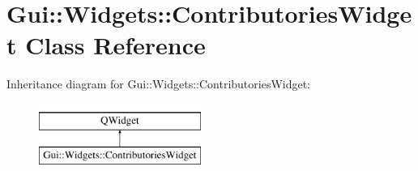 \hypertarget{classGui_1_1Widgets_1_1ContributoriesWidget}{\section{Gui\-:\-:Widgets\-:\-:Contributories\-Widget Class Reference}
\label{classGui_1_1Widgets_1_1ContributoriesWidget}
}
Inheritance diagram for Gui\-:\-:Widgets\-:\-:Contributories\-Widget\-:\begin{figure}[H]
\begin{center}
\leavevmode
\includegraphics[height=2.000000cm]{dc/da3/classGui_1_1Widgets_1_1ContributoriesWidget}
\end{center}
\end{figure}
